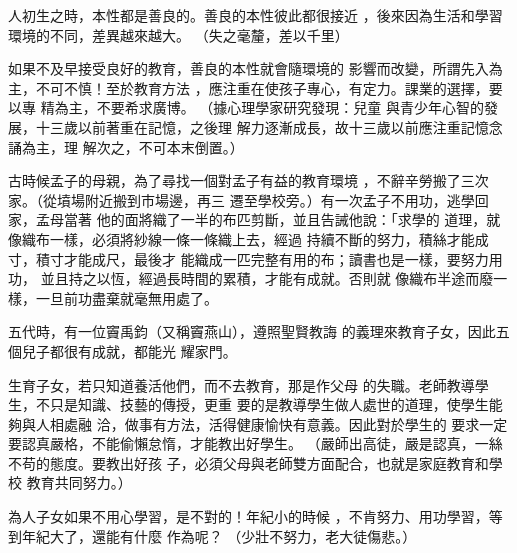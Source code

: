 \documentclass[avery5371,grid]{flashcards}
\newcommand{\doctitle}{三字經}
\newcommand{\docauthor}{}
\begin{document}
\docshowcopyright
\docshowtitle{\doctitle}{\docauthor}{%
使用双面打印，然后按线剪下。
}


{人初生之時，本性都是善良的。善良的本性彼此都很接近
，後來因為生活和學習環境的不同，差異越來越大。} %
{（失之毫釐，差以千里）} %

{如果不及早接受良好的教育，善良的本性就會隨環境的
影響而改變，所謂先入為主，不可不慎！至於教育方法
，應注重在使孩子專心，有定力。課業的選擇，要以專
精為主，不要希求廣博。} %
{（據心理學家研究發現：兒童
與青少年心智的發展，十三歲以前著重在記憶，之後理
解力逐漸成長，故十三歲以前應注重記憶念誦為主，理
解次之，不可本末倒置。）} %

{古時候孟子的母親，為了尋找一個對孟子有益的教育環境
，不辭辛勞搬了三次家。（從墳場附近搬到市場邊，再三
遷至學校旁。）有一次孟子不用功，逃學回家，孟母當著
他的面將織了一半的布匹剪斷，並且告誡他說：「求學的
道理，就像織布一樣，必須將紗線一條一條織上去，經過
持續不斷的努力，積絲才能成寸，積寸才能成尺，最後才
能織成一匹完整有用的布；讀書也是一樣，要努力用功，
並且持之以恆，經過長時間的累積，才能有成就。否則就
像織布半途而廢一樣，一旦前功盡棄就毫無用處了。} %
{} %

{五代時，有一位竇禹鈞（又稱竇燕山），遵照聖賢教誨
的義理來教育子女，因此五個兒子都很有成就，都能光
耀家門。} %
{} %

{生育子女，若只知道養活他們，而不去教育，那是作父母
的失職。老師教導學生，不只是知識、技藝的傳授，更重
要的是教導學生做人處世的道理，使學生能夠與人相處融
洽，做事有方法，活得健康愉快有意義。因此對於學生的
要求一定要認真嚴格，不能偷懶怠惰，才能教出好學生。} %
{（嚴師出高徒，嚴是認真，一絲不苟的態度。要教出好孩
子，必須父母與老師雙方面配合，也就是家庭教育和學校
教育共同努力。）} %




{為人子女如果不用心學習，是不對的！年紀小的時候
，不肯努力、用功學習，等到年紀大了，還能有什麼
作為呢？} %
{（少壯不努力，老大徒傷悲。）} %
\end{document}
